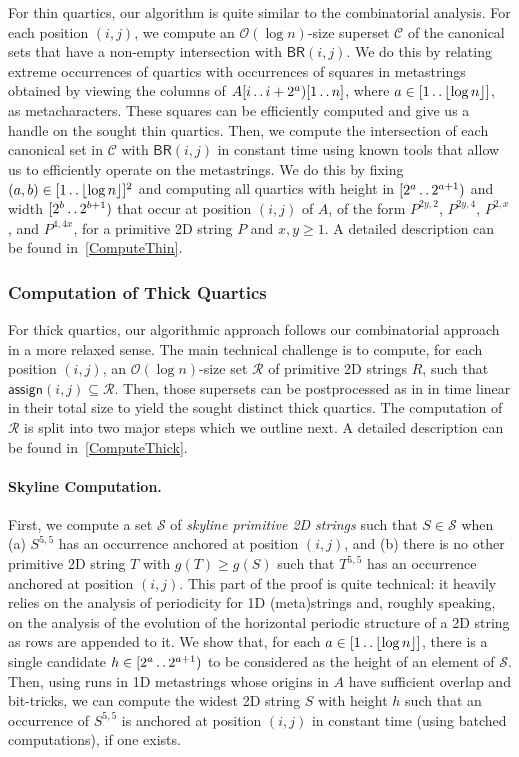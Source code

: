 \documentclass[11pt,letterpaper]{article}
\newcommand{\cO}{\mathcal{O}}
\newcommand{\floor}[1]{\left\lfloor #1 \right\rfloor}
\newcommand{\BR}{\textsf{BR}}
\def\dd{\mathinner{.\,.}}
\newcommand{\assign}{\textsf{assign}}
\renewcommand{\S}{\mathcal{S}}
\begin{document}
For thin quartics, our algorithm is quite similar to the combinatorial analysis.
For each position $(i,j)$, we compute an $\cO(\log n)$-size superset $\mathcal{C}$ of the canonical sets that have a non-empty intersection with $\BR(i,j)$.
We do this by relating extreme occurrences of quartics with occurrences of squares in metastrings obtained by viewing the columns of $A[i \dd i+2^a)[1 \dd n]$, where $a \in [1 \dd \floor{\log n}]$, as metacharacters.
These squares can be efficiently computed and give us a handle on the sought thin quartics.
Then, we compute the intersection of each canonical set in $\mathcal{C}$ with $\BR(i,j)$ in constant time
using known tools that allow us to efficiently operate on the metastrings. We do this by fixing $(a,b) \in [1 \dd \floor{\log n}]^2$ and computing all quartics with height in $[2^a \dd 2^{a+1})$ and width $[2^b \dd 2^{b+1})$ that occur at position $(i,j)$ of $A$, of the form $P^{2y,2}$, $P^{2y,4}$, $P^{2,x}$, and $P^{4,4x}$, for a primitive 2D string $P$ and $x,y\geq 1$.
A detailed description can be found in~\cref{ComputeThin}.

\subsubsection*{Computation of Thick Quartics}

For thick quartics, our algorithmic approach follows our combinatorial approach in a more relaxed sense.
The main technical challenge is to compute, for each position $(i,j)$, an $\cO(\log n)$-size set $\mathcal{R}$ of primitive 2D strings $R$, such that
$\assign(i,j) \subseteq \mathcal{R}$.
Then, those supersets can be postprocessed as in \cite{CRRWZ} in time linear in their total size to yield the sought distinct thick quartics.
The computation of $\mathcal{R}$ is split into two major steps which we outline next. A detailed description can be found in~\cref{ComputeThick}.

\paragraph*{Skyline Computation.}
First, we compute a set $\S$ of \emph{skyline primitive 2D strings} such that $S\in \mathcal{S}$ when
(a) $S^{5,5}$ has an occurrence anchored at position $(i,j)$, and (b) there is no other primitive 2D string $T$ with $g(T)\geq g(S)$ such that $T^{5,5}$ has an occurrence anchored at position $(i,j)$.
This part of the proof is quite technical:
it heavily relies on the analysis of periodicity for 1D (meta)strings and, roughly speaking, on the analysis of the evolution of the horizontal periodic structure of a 2D string as rows are appended to it.
We show that, for each $a \in [1 \dd \floor{\log n}]$, there is a single candidate $h \in [2^a \dd 2^{a+1})$ to be considered as the height of an element of $\mathcal{S}$.
Then, using runs in 1D metastrings whose origins in $A$ have sufficient overlap and bit-tricks, we can compute the widest 2D string $S$ with height $h$ such that an occurrence of $S^{5,5}$ is anchored at position $(i,j)$ in constant time (using batched computations), if one exists.
\end{document}
